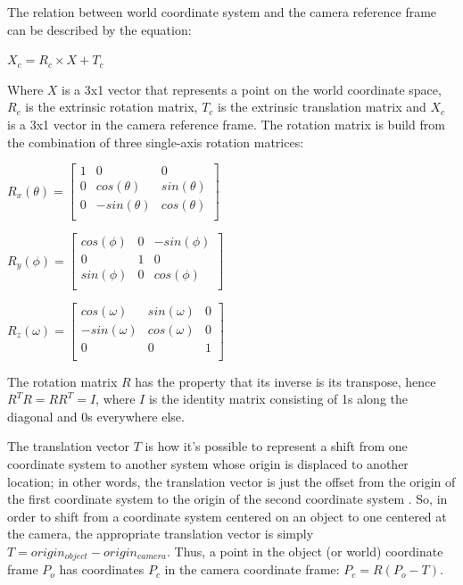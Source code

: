 \documentclass[msc, a4paper, classic, en]{ufbathesis}
\begin{document}
The relation between world coordinate system and the camera reference frame can be described by the equation:

\begin{center}
$X_c = R_c \times X + T_c$
\end{center}

Where $X$ is a 3x1 vector that represents a point on the world coordinate space, $R_c$ is the extrinsic rotation matrix, $T_c$ is the extrinsic translation matrix and $X_c$ is a 3x1 vector in the camera reference frame. The rotation matrix is build from the combination of three single-axis rotation matrices:

\begin{center}

$R_{x}(\theta) =
\begin{bmatrix}
1 & 0 & 0 \\
0 & cos(\theta) & sin(\theta) \\
0 & -sin(\theta) & cos(\theta) \\
\end{bmatrix}$

\vspace{10mm}

$R_{y}(\phi) =
\begin{bmatrix}
cos(\phi) & 0 & -sin(\phi) \\
0 & 1 & 0 \\
sin(\phi) & 0 & cos(\phi) \\
\end{bmatrix}$

\vspace{10mm}

$R_{z}(\omega) =
\begin{bmatrix}
cos(\omega) & sin(\omega) & 0 \\
-sin(\omega) & cos(\omega) & 0 \\
0 & 0 & 1 \\
\end{bmatrix}$

\end{center}

The rotation matrix $R$ has the property that its inverse is its transpose, hence $R^TR = RR^T = I$, where $I$ is the identity matrix consisting of 1s along the diagonal and 0s everywhere else.

The translation vector $T$ is how it's possible to represent a shift from one coordinate system to another system whose origin is displaced to another location; in other words, the translation vector is just the offset from the origin of the first coordinate system to the origin of the second coordinate system \cite{bradski2008learning}. So, in order to shift from a coordinate system centered on an object to one centered at the camera, the appropriate translation vector is simply $T = origin_{object} - origin_{camera}$. Thus, a point in the object (or world) coordinate frame $P_o$ has coordinates $P_c$ in the camera coordinate frame: $P_c = R(P_o - T)$.
\end{document}
